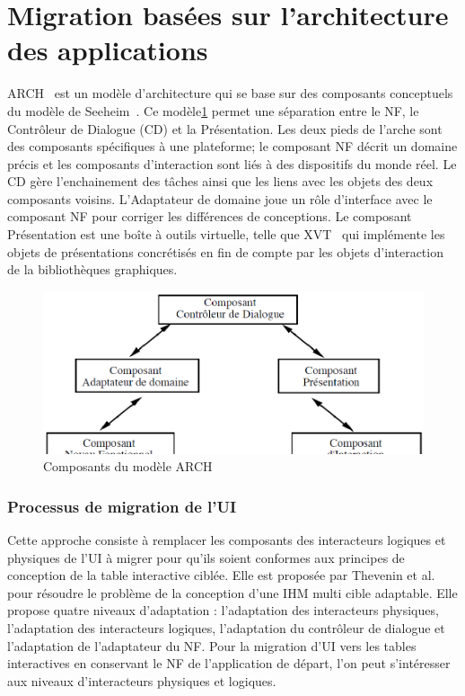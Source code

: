 \section{Migration basées sur l'architecture des applications}
\label{sec:chap3:2}

ARCH~\cite{UIMS1992} est un modèle d'architecture qui se base sur des composants conceptuels du modèle de Seeheim~\cite{Pfaff1985}. Ce modèle\ref{fig:chap3:7} permet une séparation entre le NF, le Contrôleur de Dialogue (CD) et la Présentation. Les deux pieds de l'arche sont des composants spécifiques à une plateforme; le composant NF décrit un domaine précis et les composants d'interaction sont liés à des dispositifs du monde réel. Le CD gère l'enchainement des tâches ainsi que les liens avec les objets des deux composants voisins. L'Adaptateur de domaine joue un rôle d'interface avec le composant NF pour corriger les différences de conceptions. Le composant Présentation est une boîte à outils virtuelle, telle que XVT~\cite{Valdes1989} qui implémente les objets de présentations concrétisés en fin de compte par les objets d'interaction de la bibliothèques graphiques. 
\begin{figure}[ht]
\begin{center}
\caption{Composants du modèle ARCH}
\label{fig:chap3:7}
\includegraphics[scale=0.7]{chap3/img-9}
\end{center}
\end{figure}
\subsubsection{Processus de migration de l'UI}
Cette approche consiste à remplacer les composants des interacteurs logiques et physiques de l'UI à migrer pour qu'ils soient conformes aux principes de conception de la table interactive ciblée. Elle est proposée par Thevenin et al. ~\cite{Thevenin2002} pour résoudre le problème de la conception d'une IHM multi cible adaptable. Elle propose quatre niveaux d'adaptation : l'adaptation des interacteurs physiques, l'adaptation des interacteurs logiques, l'adaptation du contrôleur de dialogue et l'adaptation de l'adaptateur du NF. Pour la migration d'UI vers les tables interactives en conservant le NF de l'application de départ, l'on peut s'intéresser aux niveaux d'interacteurs physiques et logiques.

